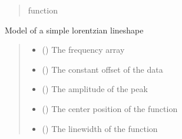 \documentclass[letterpaper,10pt,english]{sphinxmanual}
\begin{document}
\begin{fulllineitems}
\begin{fulllineitems}
\begin{quote}
\begin{description}
\sphinxAtStartPar
function

\end{description}\end{quote}

\end{fulllineitems}


\begin{fulllineitems}
\label{\detokenize{source/_autosummary/HDF5_BLS_treat.Models:HDF5_BLS_treat.Models.lorentzian}}
\pysigstartsignatures
\pysiglinewithargsret
{}
{\sphinxparamcomma {}\sphinxparamcomma {}\sphinxparamcomma {}\sphinxparamcomma {}\sphinxparamcomma {}}
{}
\pysigstopsignatures
\sphinxAtStartPar
Model of a simple lorentzian lineshape
\begin{quote}\begin{description}
\begin{itemize}
\item {} 
\sphinxAtStartPar
{} () \textendash{} The frequency array

\item {} 
\sphinxAtStartPar
{} () \textendash{} The constant offset of the data

\item {} 
\sphinxAtStartPar
{} () \textendash{} The amplitude of the peak

\item {} 
\sphinxAtStartPar
{} () \textendash{} The center position of the function

\item {} 
\sphinxAtStartPar
{} () \textendash{} The linewidth of the function


\end{itemize}
\end{description}
\end{quote}
\end{fulllineitems}
\end{fulllineitems}
\end{document}
